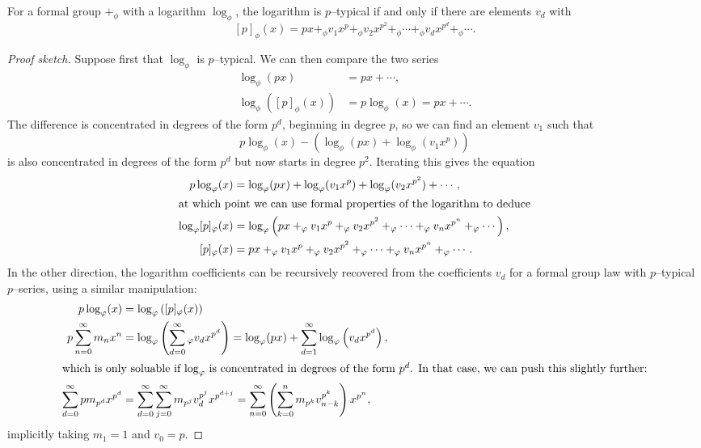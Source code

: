 \begin{lemma}\label{pTypLogGivesNicePSeries}
For a formal group $+_\phi$ with a logarithm $\log_\phi$, the logarithm is $p$--typical if and only if there are elements $v_d$ with \[[p]_\phi(x) = px +_\phi v_1 x^p +_\phi v_2 x^{p^2} +_\phi \cdots +_\phi v_d x^{p^d} +_\phi \cdots.\]
\end{lemma}
\begin{proof}[Proof sketch]
Suppose first that $\log_\phi$ is $p$--typical.  We can then compare the two series
\begin{align*}
\log_\phi(px) & = px + \cdots, \\
\log_\phi([p]_\phi(x)) & = p \log_\phi(x) = px + \cdots.
\end{align*}
The difference is concentrated in degrees of the form $p^d$, beginning in degree $p$, so we can find an element $v_1$ such that \[p \log_\phi(x) - (\log_\phi(px) + \log_\phi(v_1 x^p))\] is also concentrated in degrees of the form $p^d$ but now starts in degree $p^2$.  Iterating this gives the equation
\begin{align*}
p \log_\phi(x) & = \log_\phi (px) + \log_\phi(v_1 x^p) + \log_\phi(v_2 x^{p^2}) + \cdots, \\
\intertext{at which point we can use formal properties of the logarithm to deduce}
\log_\phi [p]_\phi(x) & = \log_\phi \left(px +_\phi v_1 x^p +_\phi v_2 x^{p^2} +_\phi \cdots +_\phi v_n x^{p^n} +_\phi \cdots\right), \\
[p]_\phi(x) & = px +_\phi v_1 x^p +_\phi v_2 x^{p^2} +_\phi \cdots +_\phi v_n x^{p^n} +_\phi \cdots.
\end{align*}
In the other direction, the logarithm coefficients can be recursively recovered from the coefficients $v_d$ for a formal group law with $p$--typical $p$--series, using a similar manipulation:
\begin{align*}
p \log_\phi(x) & = \log_\phi\left([p]_\phi(x)\right) \\
p \sum_{n=0}^\infty m_n x^n & = \log_\phi \left(\sum_{d=0}^\infty{}_\phi v_d x^{p^d} \right) = \log_\phi(px) + \sum_{d=1}^\infty \log_\phi\left(v_d x^{p^d}\right), \\
\intertext{which is only soluable if $\log_\phi$ is concentrated in degrees of the form $p^d$.  In that case, we can push this slightly further:}
\sum_{d=0}^\infty p m_{p^d} x^{p^d} & = \sum_{d=0}^\infty \sum_{j=0}^\infty m_{p^j} v_d^{p^j} x^{p^{d+j}} = \sum_{n=0}^\infty \left( \sum_{k=0}^n m_{p^k} v_{n-k}^{p^k} \right) x^{p^n},
\end{align*}
implicitly taking $m_1 = 1$ and $v_0 = p$.
\end{proof}

